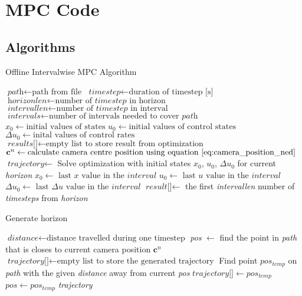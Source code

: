 \chapter{MPC Code}

\section{Algorithms}
\label{sec:appendix_algorithms}

\begin{algorithm}
\caption{Offline Intervalwise MPC Algorithm}
\label{alg:mpc}
\begin{algorithmic}
	\State $\textit{path} \gets \text{path from file}$
	\State $\textit{timestep} \gets \text{duration of timestep [s]}$
	\State $\textit{horizonlen} \gets \text{number of } \textit{timestep} \text{ in horizon}$
	\State $\textit{intervallen} \gets \text{number of } \textit{timestep} \text{ in interval}$
	\State $\textit{intervals} \gets \text{number of intervals needed to cover } \textit{path}$
	\State $\textit{x}_0 \gets \text{initial values of states}$
	\State $\textit{u}_0 \gets \text{initial values of control states}$
	\State $\Delta\textit{u}_0 \gets \text{inital values of control rates}$
	\State $\textit{results[]} \gets \text{empty list to store result from optimization}$
		\State $\mathbf{c}^n \gets \text{calculate camera centre position using equation } \ref{eq:camera_position_ned}$
		\State $\textit{trajectory} \gets$ 
		\State Solve optimization with initial states $x_0$, $u_0$, $\Delta u_0$ for current \textit{horizon}
		\State $\textit{x}_0 \gets \text{ last } \textit{x} \text{ value in the } \textit{interval}$
		\State $\textit{u}_0 \gets \text{ last } \textit{u} \text{ value in the } \textit{interval}$
		\State $\Delta\textit{u}_0 \gets \text{ last } \Delta\textit{u} \text{ value in the } \textit{interval}$
		\State $\textit{result[]} \gets$ the first \textit{intervallen} number of \textit{timesteps} from \textit{horizon}
	\EndFor
\EndProcedure
\end{algorithmic}
\end{algorithm}

\begin{algorithm}
\caption{Generate horizon}
\label{alg:genHor}
\begin{algorithmic}
	\State $\textit{distance} \gets \text{distance travelled during one timestep}$
	\State \textit{pos} $\gets$ find the point in \textit{path} that is closes to current camera position $\mathbf{c}^n$
	\State $\textit{trajectory[]} \gets \text{empty list to store the generated trajectory}$
		\State Find point \textit{$pos_{temp}$} on \textit{path} with the given \textit{distance} away from current \textit{pos}
		\State $\textit{trajectory[]} \gets pos_{temp}$
		\State $pos \gets pos_{temp}$
	\EndFor
	\Return \textit{trajectory}
\EndProcedure
\end{algorithmic}
\end{algorithm}